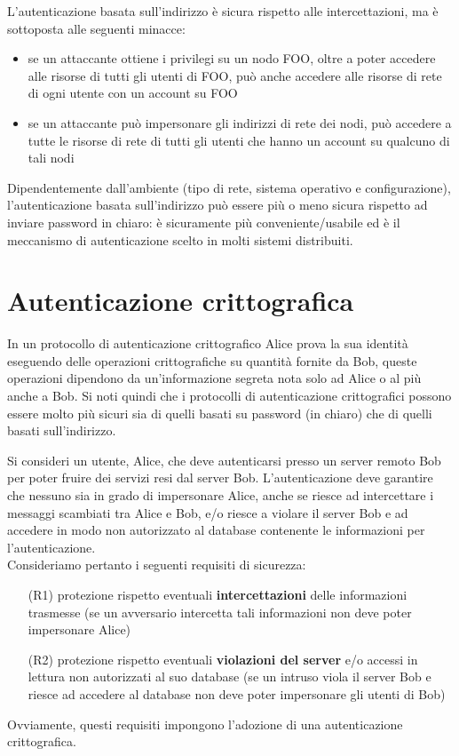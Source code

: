 L'autenticazione basata sull'indirizzo è sicura rispetto alle intercettazioni, ma è sottoposta alle seguenti minacce:
\begin{itemize}
\item se un attaccante ottiene i privilegi su un nodo FOO, oltre a poter accedere alle risorse di tutti gli utenti di FOO, può anche accedere alle risorse di rete di ogni utente con un account su FOO
\item se un attaccante può impersonare gli indirizzi di rete dei nodi, può accedere a tutte le risorse di rete di tutti gli utenti che hanno un account su qualcuno di tali nodi
\end{itemize}
Dipendentemente dall'ambiente (tipo di rete, sistema operativo e configurazione), l'autenticazione basata sull'indirizzo può essere più o meno sicura rispetto ad inviare password in chiaro: è sicuramente più conveniente/usabile ed è il meccanismo di autenticazione scelto in molti sistemi distribuiti.

\section{Autenticazione crittografica}
In un protocollo di autenticazione crittografico Alice prova la sua identità eseguendo delle operazioni crittografiche su quantità fornite da Bob, queste operazioni dipendono da un'informazione segreta nota solo ad Alice o al più anche a Bob. Si noti quindi che i protocolli di autenticazione crittografici possono essere molto più sicuri sia di quelli basati su password (in chiaro) che di quelli basati sull'indirizzo. 

Si consideri un utente, Alice, che deve autenticarsi presso un server remoto Bob per poter fruire dei servizi resi dal server Bob. L'autenticazione deve garantire che nessuno sia in grado di impersonare Alice, anche se riesce ad intercettare i messaggi scambiati tra Alice e Bob, e/o riesce a violare il server Bob e ad accedere in modo non autorizzato al database contenente le informazioni per l'autenticazione.\\
Consideriamo pertanto i seguenti requisiti di sicurezza:
\begin{itemize}
	\item [(R1)] protezione rispetto eventuali \textbf{intercettazioni} delle informazioni trasmesse (se un avversario intercetta tali informazioni non deve poter impersonare Alice)
	\item [(R2)] protezione rispetto eventuali \textbf{violazioni del server}  e/o accessi in lettura non autorizzati al suo database (se un intruso viola il server Bob e riesce ad accedere al database non deve poter impersonare gli utenti di Bob)
\end{itemize}
Ovviamente, questi requisiti impongono l'adozione di una autenticazione crittografica.
